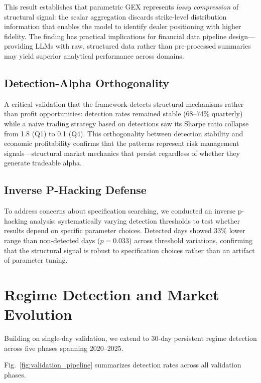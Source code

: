 This result establishes that parametric GEX represents \textit{lossy compression} of structural signal: the scalar aggregation discards strike-level distribution information that enables the model to identify dealer positioning with higher fidelity. The finding has practical implications for financial data pipeline design---providing LLMs with raw, structured data rather than pre-processed summaries may yield superior analytical performance across domains.

\subsection{Detection-Alpha Orthogonality}

A critical validation that the framework detects structural mechanisms rather than profit opportunities: detection rates remained stable (68--74\% quarterly) while a naive trading strategy based on detections saw its Sharpe ratio collapse from 1.8 (Q1) to 0.1 (Q4). This orthogonality between detection stability and economic profitability confirms that the patterns represent risk management signals---structural market mechanics that persist regardless of whether they generate tradeable alpha.

\subsection{Inverse P-Hacking Defense}

To address concerns about specification searching, we conducted an inverse p-hacking analysis: systematically varying detection thresholds to test whether results depend on specific parameter choices. Detected days showed 33\% lower range than non-detected days ($p = 0.033$) across threshold variations, confirming that the structural signal is robust to specification choices rather than an artifact of parameter tuning.

\FloatBarrier

\section{Regime Detection and Market Evolution}
\label{sec:regime}

Building on single-day validation, we extend to 30-day persistent regime detection across five phases spanning 2020--2025.

Fig.~\ref{fig:validation_pipeline} summarizes detection rates across all validation phases.


